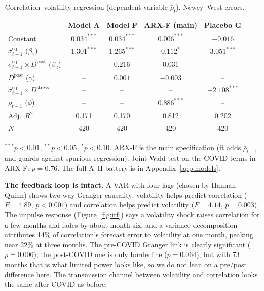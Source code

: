 \documentclass[11pt,a4paper]{article}
\newcommand{\rhobar}{\bar{\rho}}
\newcommand{\sigmaEq}{\sigma^{\text{eq}}}
\newcommand{\Dpost}{D^{\text{post}}}
\begin{document}
\begin{table}[H]
\centering
\caption{Correlation--volatility regression (dependent variable $\rhobar_t$), Newey--West errors.}
\label{tab:models}
\small
\begin{tabular}{lcccc}
\toprule
 & Model A & Model F & ARX-F (main) & Placebo G \\
\midrule
Constant                         & $0.034^{***}$ & $0.034^{***}$ & $0.006^{***}$ & $-0.016$ \\
$\sigmaEq_{t-1}$ ($\beta_1$)     & $1.301^{***}$ & $1.265^{***}$ & $0.112^{*}$   & $3.051^{***}$ \\
$\sigmaEq_{t-1}\!\times\!\Dpost$ ($\beta_2$) & -- & $0.216$ & $0.031$ & -- \\
$\Dpost$ ($\gamma$)              & -- & $0.001$ & $-0.003$ & -- \\
$\sigmaEq_{t-1}\!\times\!D^{\text{stress}}$ & -- & -- & -- & $-2.108^{***}$ \\
$\rhobar_{t-1}$ ($\phi$)         & -- & -- & $0.886^{***}$ & -- \\
\midrule
Adj.\ $R^2$ & 0.171 & 0.170 & 0.812 & 0.202 \\
$N$         & 420   & 420   & 420   & 420 \\
\bottomrule
\end{tabular}
\begin{flushleft}
\footnotesize
$^{***}p<0.01$, $^{**}p<0.05$, $^{*}p<0.10$. ARX-F is the main specification (it adds $\rhobar_{t-1}$ and
guards against spurious regression). Joint Wald test on the COVID terms in ARX-F: $p=0.76$. The full
A--H battery is in Appendix~\ref{app:models}.
\end{flushleft}
\end{table}

\textbf{The feedback loop is intact.} A VAR with four lags (chosen by Hannan--Quinn) shows two-way Granger
causality: volatility helps predict correlation ($F=4.89$, $p<0.001$) and correlation helps predict
volatility ($F=4.14$, $p=0.003$). The impulse response (Figure~\ref{fig:irf}) says a volatility shock
raises correlation for a few months and fades by about month six, and a variance decomposition attributes
14\% of correlation's forecast error to volatility at one month, peaking near 22\% at three months. The
pre-COVID Granger link is clearly significant ($p=0.006$); the post-COVID one is only borderline
($p=0.064$), but with 73 months that is what limited power looks like, so we do not lean on a pre/post
difference here. The transmission channel between volatility and correlation looks the same after COVID as
before.
\end{document}
